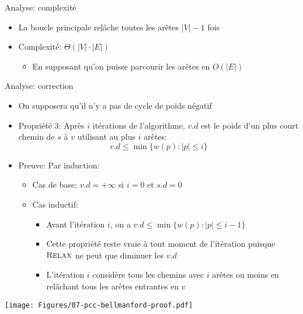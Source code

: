 \begin{frame}{Analyse: complexité}

\begin{center}
{\small
{}}
\end{center}

\begin{itemize}
\item La boucle principale relâche toutes les arêtes $|V|-1$ fois
\item Complexité: $\Theta(|V|\cdot |E|)$
\begin{itemize}
\item En supposant qu'on puisse parcourir les arêtes en $O(|E|)$
\end{itemize}
\end{itemize}

\end{frame}

\begin{frame}{Analyse: correction}

\begin{itemize}
\item On supposera qu'il n'y a pas de cycle de poids négatif
\item Propriété 3: Après $i$ itérations de l'algorithme, $v.d$ est le
  poids d'un plus court chemin de $s$ à $v$ utilisant au plus $i$ arêtes:
$$v.d\leq \min\{w(p): |p|\leq i\}$$
\item Preuve: Par induction:
\begin{itemize}
\item Cas de base: $v.d=+\infty$ si $i=0$ et $s.d=0$
\item Cas inductif:
\begin{itemize}
\item Avant l'itération $i$, on a $v.d\leq \min\{w(p):|p|\leq i-1\}$
\item Cette propriété reste vraie à tout moment de l'itération puisque
  $\textnormal{\scshape Relax}$ ne peut que diminuer les $v.d$
\item L'itération $i$ considère tous les chemins avec $i$ arêtes ou
  moins en relâchant tous les arêtes entrantes en $v$
\end{itemize}
\end{itemize}
\end{itemize}

\centerline{\texttt{[image: Figures/07-pcc-bellmanford-proof.pdf]}}


\end{frame}

